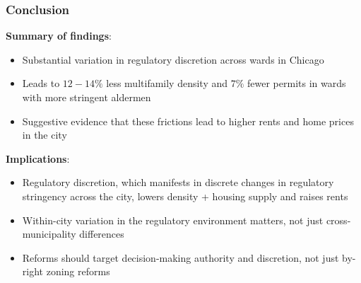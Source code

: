 \begin{frame}[shrink=8]
    \frametitle{Conclusion}

    \textbf{Summary of findings}:
    \begin{itemize}[itemsep=0.12em,topsep=0.15em]
        \item Substantial variation in regulatory discretion across wards in Chicago
        \item Leads to $12-14\%$ less multifamily density and $7\%$ fewer permits in wards with more stringent aldermen
        \item Suggestive evidence that these frictions lead to higher rents and home prices in the city
    \end{itemize}

    \vspace{0.15em}
    \textbf{Implications}:
    \begin{itemize}[itemsep=0.12em,topsep=0.15em]
        \item Regulatory discretion, which manifests in discrete changes in regulatory stringency across the city, lowers density + housing supply and raises rents
        \item Within-city variation in the regulatory environment matters, not just cross-municipality differences
        \item Reforms should target decision-making authority and discretion, not just by-right zoning reforms
    \end{itemize}

\end{frame}
